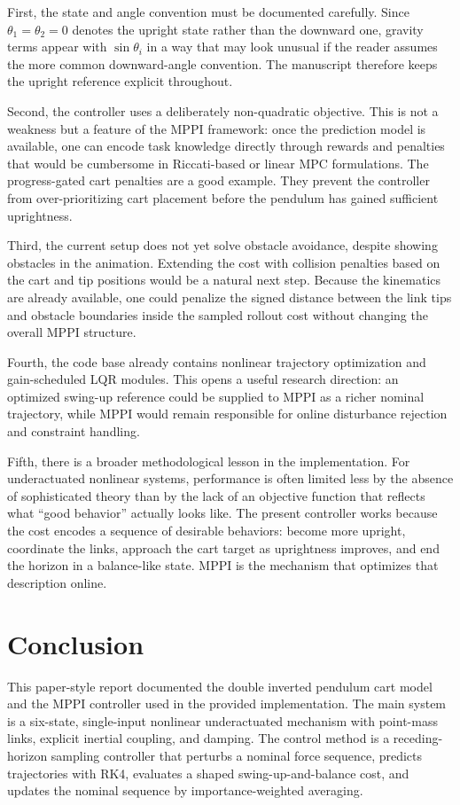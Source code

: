 \documentclass[conference]{IEEEtran}
\begin{document}
First, the state and angle convention must be documented carefully. Since $\theta_1=\theta_2=0$ denotes the upright state rather than the downward one, gravity terms appear with $\sin\theta_i$ in a way that may look unusual if the reader assumes the more common downward-angle convention. The manuscript therefore keeps the upright reference explicit throughout.

Second, the controller uses a deliberately non-quadratic objective. This is not a weakness but a feature of the MPPI framework: once the prediction model is available, one can encode task knowledge directly through rewards and penalties that would be cumbersome in Riccati-based or linear MPC formulations. The progress-gated cart penalties are a good example. They prevent the controller from over-prioritizing cart placement before the pendulum has gained sufficient uprightness.

Third, the current setup does not yet solve obstacle avoidance, despite showing obstacles in the animation. Extending the cost with collision penalties based on the cart and tip positions would be a natural next step. Because the kinematics are already available, one could penalize the signed distance between the link tips and obstacle boundaries inside the sampled rollout cost without changing the overall MPPI structure.

Fourth, the code base already contains nonlinear trajectory optimization and gain-scheduled LQR modules. This opens a useful research direction: an optimized swing-up reference could be supplied to MPPI as a richer nominal trajectory, while MPPI would remain responsible for online disturbance rejection and constraint handling.

Fifth, there is a broader methodological lesson in the implementation. For underactuated nonlinear systems, performance is often limited less by the absence of sophisticated theory than by the lack of an objective function that reflects what ``good behavior'' actually looks like. The present controller works because the cost encodes a sequence of desirable behaviors: become more upright, coordinate the links, approach the cart target as uprightness improves, and end the horizon in a balance-like state. MPPI is the mechanism that optimizes that description online.

\section{Conclusion}
This paper-style report documented the double inverted pendulum cart model and the MPPI controller used in the provided implementation. The main system is a six-state, single-input nonlinear underactuated mechanism with point-mass links, explicit inertial coupling, and damping. The control method is a receding-horizon sampling controller that perturbs a nominal force sequence, predicts trajectories with RK4, evaluates a shaped swing-up-and-balance cost, and updates the nominal sequence by importance-weighted averaging.
\end{document}
